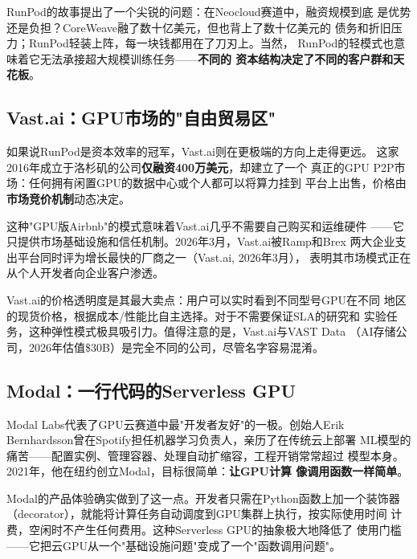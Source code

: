 RunPod的故事提出了一个尖锐的问题：在Neocloud赛道中，融资规模到底
是优势还是负担？CoreWeave融了数十亿美元，但也背上了数十亿美元的
债务和折旧压力；RunPod轻装上阵，每一块钱都用在了刀刃上。当然，
RunPod的轻模式也意味着它无法承接超大规模训练任务——\textbf{不同的
资本结构决定了不同的客户群和天花板}。

\subsection{Vast.ai：GPU市场的"自由贸易区"}
\label{subsec:vastai}

如果说RunPod是资本效率的冠军，Vast.ai则在更极端的方向上走得更远。
这家2016年成立于洛杉矶的公司\textbf{仅融资400万美元}，却建立了一个
真正的GPU P2P市场：任何拥有闲置GPU的数据中心或个人都可以将算力挂到
平台上出售，价格由\textbf{市场竞价机制}动态决定。

这种"GPU版Airbnb"的模式意味着Vast.ai几乎不需要自己购买和运维硬件
——它只提供市场基础设施和信任机制。2026年3月，Vast.ai被Ramp和Brex
两大企业支出平台同时评为增长最快的厂商之一（Vast.ai, 2026年3月），
表明其市场模式正在从个人开发者向企业客户渗透。

Vast.ai的价格透明度是其最大卖点：用户可以实时看到不同型号GPU在不同
地区的现货价格，根据成本/性能比自主选择。对于不需要保证SLA的研究和
实验任务，这种弹性模式极具吸引力。值得注意的是，Vast.ai与VAST Data
（AI存储公司，2026年估值\$30B）是完全不同的公司，尽管名字容易混淆。

\subsection{Modal：一行代码的Serverless GPU}
\label{subsec:modal}

Modal Labs代表了GPU云赛道中最"开发者友好"的一极。创始人Erik
Bernhardsson曾在Spotify担任机器学习负责人，亲历了在传统云上部署
ML模型的痛苦——配置实例、管理容器、处理自动扩缩容，工程开销常常超过
模型本身。2021年，他在纽约创立Modal，目标很简单：\textbf{让GPU计算
像调用函数一样简单}。

Modal的产品体验确实做到了这一点。开发者只需在Python函数上加一个装饰器
（decorator），就能将计算任务自动调度到GPU集群上执行，按实际使用时间
计费，空闲时不产生任何费用。这种Serverless GPU的抽象极大地降低了
使用门槛——它把云GPU从一个"基础设施问题"变成了一个"函数调用问题"。

